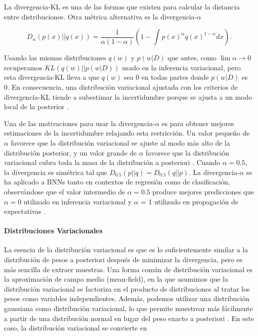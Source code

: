 \documentclass[10pt, oneside, a4paper]{article}
\begin{document}
	La divergencia-KL es una de las formas que existen para calcular la distancia entre distribuciones. Otra métrica alternativa es la divergencia-$\alpha$ \cite{amari2012differential, zhu_information, hortua2020reliable}
	
	\begin{equation} \label{eq:10}
	D_{\alpha}(p(x) || q(x)) = \frac{1}{\alpha(1-\alpha)} \left( 1 - \int p(x)^{\alpha} q(x)^{1-\alpha} dx \right).
	\end{equation}

	Usando las mismas distribuciones $q(w)$ y $p(w|D)$ que antes, como $\lim \alpha \to 0$ recuperamos $KL(q(w) || p(w|D))$ usado en la inferencia variacional, pero esta divergencia-KL lleva a que $q(w)$ sea 0 en todas partes donde $p(w|D)$ es 0. En consecuencia, una distribución variacional ajustada con los criterios de divergencia-KL tiende a subestimar la incertidumbre porque se ajusta a un modo local de la posterior \cite{li2017dropout,pmlr-v48-hernandez-lobatob16}.
	
	Una de las motivaciones para usar la divergencia-$\alpha$ es para obtener mejores estimaciones de la incertidumbre relajando esta restricción. Un valor pequeño de $\alpha$ favorece que la distribución variacional se ajuste al modo más alto de la distribución posterior, y un valor grande de $\alpha$ favorece que la distribución variacional cubra toda la masa de la distribución a posteriori \cite{pmlr-v48-hernandez-lobatob16}. Cuando $\alpha = 0.5$, la divergencia es simétrica tal que $D_{0.5}(p||q) = D_{0.5}(q||p)$. La divergencia-$\alpha$ se ha aplicado a BNNs tanto en contextos de regresión como de clasificación, observándose que el valor intermedio de $\alpha = 0.5$ produce mejores predicciones que $\alpha = 0$ utilizado en inferencia variacional y $\alpha$ = 1 utilizado en propagación de expectativas \cite{li2017dropout,pmlr-v48-hernandez-lobatob16,depeweg2016learning}. 

	\paragraph{Distribuciones Variacionales}
	
	La esencia de la distribución variacional es que es lo suficientemente similar a la distribución de pesos a posteriori después de minimizar la divergencia, pero es más sencilla de extraer muestras. Una forma común de distribución variacional es la aproximación de campo medio (mean-field), en la que asumimos que la distribución variacional se factoriza en el producto de distribuciones al tratar los pesos como variables independientes. Además, podemos utilizar una distribución gaussiana como distribución variacional, lo que permite muestrear más fácilmente a partir de una distribución normal en lugar del peso exacto a posteriori \cite{chai2018uncertainty, mnf, louizos2017multiplicative, Hort_a_2023}. En este caso, la distribución variacional se convierte en
\end{document}
